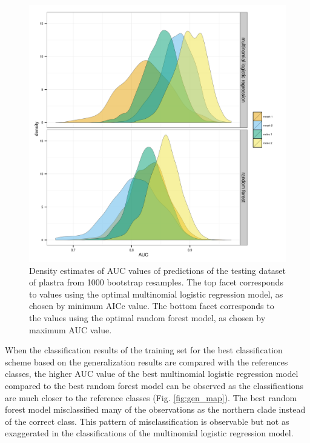 \documentclass[12pt,letterpaper]{article}\usepackage{graphicx, color}
\begin{document}
\begin{figure}[ht]
  \centering
  \includegraphics[width = \textwidth]{figure/gen_res}
  \caption{Density estimates of AUC values of predictions of the testing dataset of plastra from 1000 bootstrap resamples. The top facet corresponds to values using the optimal multinomial logistic regression model, as chosen by minimum AICc value. The bottom facet corresponds to the values using the optimal random forest model, as chosen by maximum AUC value.}
  \label{fig:gen_res}
\end{figure}

When the classification results of the training set for the best classification scheme based on the generalization results are compared with the references classes, the higher AUC value of the best multinomial logistic regression model compared to the best random forest model can be observed as the classifications are much closer to the reference classes (Fig. \ref{fig:gen_map}). The best random forest model misclassified many of the observations as the northern clade instead of the correct class. This pattern of misclassification is observable but not as exaggerated in the classifications of the multinomial logistic regression model.
\end{document}
